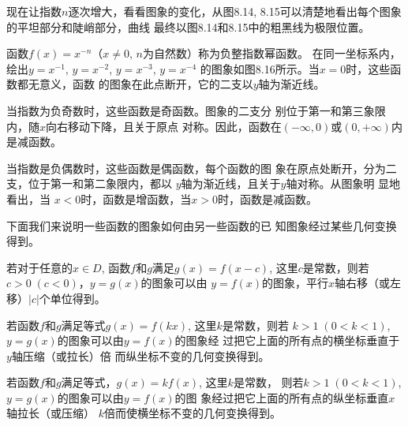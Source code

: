 现在让指数$n$逐次增大，看看图象的变化，从图8.14,
8.15可以清楚地看出每个图象的平坦部分和陡峭部分，曲线
最终以图8.14和8.15中的粗黑线为极限位置。

函数$f(x)=x^{-n}$（$x\ne 0$, $n$为自然数）称为负整指数幂函数。
在同一坐标系内，绘出$y=x^{-1}$, $y=x^{-2}$, $y=x^{-3}$, $y=x^{-4}$
的图象如图8.16所示。当$x=0$时，这些函数都无意义，函数
的图象在此点断开，它的二支以$y$轴为渐近线。

当指数为负奇数时，这些函数是奇函数。图象的二支分
别位于第一和第三象限内，随$x$向右移动下降，且关于原点
对称。因此，函数在$(-\infty,0)$或$(0,+\infty)$内是减函数。

当指数是负偶数时，这些函数是偶函数，每个函数的图
象在原点处断开，分为二支，位于第一和第二象限内，都以
$y$轴为渐近线，且关于$y$轴对称。从图象明 显地看出，当
$x<0$时，函数是增函数，当$x>0$时，函数是减函数。

下面我们来说明一些函数的图象如何由另一些函数的已
知图象经过某些几何变换得到。

若对于任意的$x\in D$, 函数$f$和$g$满足$g(x)=f(x-c)$,
这里$c$是常数，则若$c>0\; (c<0)$，$y=g(x)$的图象可以由
$y=f(x)$的图象，平行$x$轴右移（或左移）$|c|$个单位得到。

若函数$f$和$g$满足等式$g(x)=f(kx)$, 这里$k$是常数，则若
$k>1\; (0<k<1)$, $y=g(x)$的图象可以由$y=f(x)$的图象经
过把它上面的所有点的横坐标垂直于$y$轴压缩（或拉长）倍
而纵坐标不变的几何变换得到。

若函数$f$和$g$满足等式，$g(x)=kf(x)$, 这里$k$是常数，
则若$k>1\; (0<k<1)$, $y=g(x)$的图象可以由$y=f(x)$的图
象经过把它上面的所有点的纵坐标垂直$x$轴拉长（或压缩）
$k$倍而使横坐标不变的几何变换得到。

